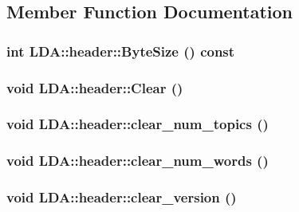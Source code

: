 \subsection{Member Function Documentation}
\hypertarget{class_l_d_a_1_1header_a75db3ae5495fa84b189da5d7fe633f29}{
\subsubsection[{ByteSize}]{\setlength{\rightskip}{0pt plus 5cm}int LDA::header::ByteSize () const}}
\label{class_l_d_a_1_1header_a75db3ae5495fa84b189da5d7fe633f29}
\hypertarget{class_l_d_a_1_1header_a1b9b77bd3587d9ea67504e627ff9a2d7}{
\subsubsection[{Clear}]{\setlength{\rightskip}{0pt plus 5cm}void LDA::header::Clear ()}}
\label{class_l_d_a_1_1header_a1b9b77bd3587d9ea67504e627ff9a2d7}
\hypertarget{class_l_d_a_1_1header_a591a1b1e2dc7b62f6f06b9cb2d0d28bf}{
\subsubsection[{clear\_\-num\_\-topics}]{\setlength{\rightskip}{0pt plus 5cm}void LDA::header::clear\_\-num\_\-topics ()}}
\label{class_l_d_a_1_1header_a591a1b1e2dc7b62f6f06b9cb2d0d28bf}
\hypertarget{class_l_d_a_1_1header_a5b0dbd43420ede8f188235acb21ab889}{
\subsubsection[{clear\_\-num\_\-words}]{\setlength{\rightskip}{0pt plus 5cm}void LDA::header::clear\_\-num\_\-words ()}}
\label{class_l_d_a_1_1header_a5b0dbd43420ede8f188235acb21ab889}
\hypertarget{class_l_d_a_1_1header_a650d9337806ae2b17519c035d90eecf6}{
\subsubsection[{clear\_\-version}]{\setlength{\rightskip}{0pt plus 5cm}void LDA::header::clear\_\-version ()}}
